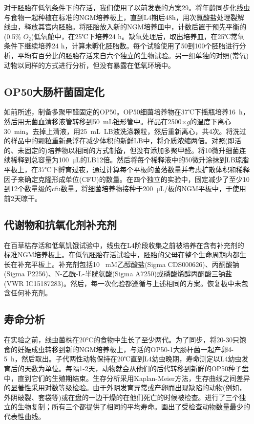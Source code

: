 \documentclass{ctexart}
\begin{document}
        对于胚胎在低氧条件下的存活，我们使用了以前发表的方案29。将年龄同步化线虫与食物一起种植在标准的NGM培养板上，直到L4期后48h，用次氯酸盐处理裂解线虫，释放其宫内胚胎。将胚胎放入新的NGM培养皿中，计数后置于预先平衡的(0.5\% $O_2$)低氧舱中，在25℃下培养24 h。缺氧处理后，取出培养皿，在25℃常氧条件下继续培养24 h，计算未孵化胚胎数。每个试验使用了50到100个胚胎进行分析，平均有百分比的胚胎存活来自六个独立的生物试验。另一组单独的对照(常氧)动物以同样的方式进行分析，但没有暴露在低氧环境中。

        \subsection{OP50大肠杆菌固定化}

        如前所述，制备多聚甲醛固定的OP50。OP50细菌培养物在37℃下摇瓶培养16~h，然后用无菌血清移液管转移到50~mL锥形管中。样品在2500$\times g$的温度下离心30~min。去掉上清液，用25~mL~LB液洗涤颗粒，然后重新离心，共4次。将洗过的样品中的颗粒重新悬浮在减少体积的新鲜LB中，将介质浓缩两倍。对照(即活的、未固定的)培养物以相同的方式制备，但没有添加多聚甲醛。将10微升细菌连续稀释到总容量为100~μL的LB12倍。然后将每个稀释液中的50微升涂抹到LB琼脂平板上，在37℃下孵育过夜，通过计算每个平板的菌落数量并考虑扩散体积和稀释因子来确定克隆形成单位(CFU)的数量。在四个独立的实验中，固定减少了至少10到12个数量级的cfu数量。将细菌培养物接种于200~μL/板的NGM平板中，于使用前2天晾干。

        \subsection{代谢物和抗氧化剂补充剂}

        在百草枯存活和低氧饥饿试验中，线虫在L4阶段收集之前被培养在含有补充剂的标准NGM培养板上。在低氧胚胎存活试验中，胚胎的父母在整个生命周期内都生长在补充平板上。补充剂包括10 ~mM乙醇酸盐(Sigma CDS000626)、丙酮酸钠(Sigma P2256)、N-乙酰-L-半胱氨酸(Sigma A7250)或磷酸烯醇丙酮酸三钠盐(VWR IC15187283)。然后，每一次化验都遵循与上述相同的方案。恢复板中未包含任何补充剂。

        \subsection{寿命分析}

        在实验之前，线虫菌株在20°C的食物中生长了至少两代。为了同步，将20-30只饱食的妊娠成虫转移到新的NGM培养板上，与活的OP50-1大肠杆菌一起产卵4-5~h，然后取出。子代两性动物保持在20℃直到L4幼虫晚期，寿命测定以L4幼虫发育后的天数为单位。每隔1-2天，动物就会从他们的后代转移到新鲜的OP50种子盘中，直到它们的生殖期结束。生存分析采用Kaplan-Meier方法，生存曲线之间差异的显著性采用对数等级检验。由于外阴发育异常或产卵而出现缺陷的动物(例如，外阴破裂、套袋等)或在盘的一边干燥的在他们死亡的时候被检查。进行了三个独立的生物复制；所有三个都提供了相同的平均寿命。画出了受检查动物数量最少的代表性曲线。
\end{document}
